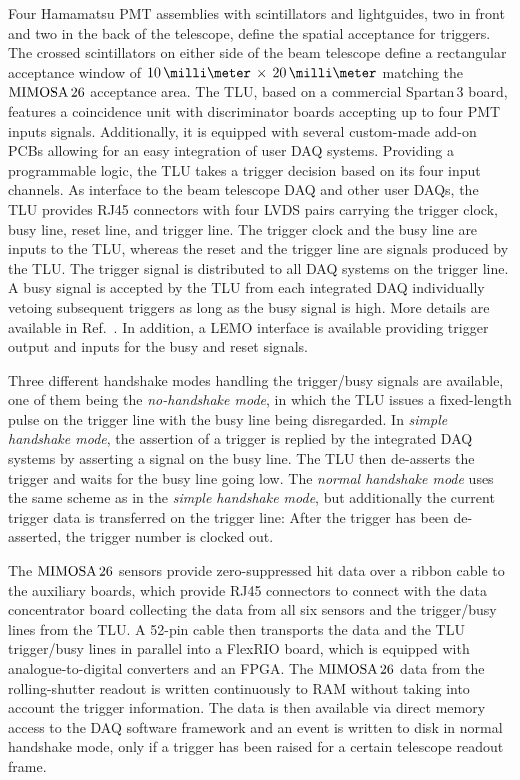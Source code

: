Four Hamamatsu PMT assemblies with scintillators and lightguides, two in front and two in the back of the telescope, define the spatial acceptance for triggers. 
The crossed scintillators on either side of the beam telescope define a rectangular acceptance window of $10\,\milli\meter\,\times\,20\,\milli\meter$ matching the $\textrm{MIMOSA\,26}$ acceptance area. 
The TLU, based on a commercial Spartan\,3 board, features a coincidence unit with discriminator boards accepting up to four PMT inputs signals. 
Additionally, it is equipped with several custom-made add-on PCBs allowing for an easy integration of user DAQ systems. 
Providing a programmable logic, the TLU  takes a trigger decision based on its four input channels. 
As interface to the beam telescope DAQ and other user DAQs, the TLU provides RJ45 connectors with four LVDS pairs carrying the trigger clock, busy line, reset line, and trigger line. 
The trigger clock and the busy line are inputs to the TLU, whereas the reset and the trigger line are signals produced by the TLU. 
The trigger signal is distributed to all DAQ systems on the trigger line. 
A busy signal is accepted by the TLU from each integrated DAQ individually vetoing subsequent triggers as long as the busy signal is high. 
More details are available in Ref.~\cite{TLU,ref:TLUproc}.
In addition, a LEMO interface is available providing trigger output and inputs for the busy and reset signals.

Three different handshake modes handling the trigger/busy signals are available, one of them being the \textit{no-handshake mode},
 in which the TLU issues a fixed-length pulse on the trigger line with the busy line being disregarded. 
In \textit{simple handshake mode}, the assertion of a trigger is replied by the integrated DAQ systems by asserting a signal on the busy line. 
The TLU then de-asserts the trigger and waits for the busy line going low.
The \textit{normal handshake mode} uses the same scheme as in the \textit{simple handshake mode}, but additionally the current trigger data is transferred on the trigger line:
After the trigger has been de-asserted, the trigger number is clocked out. 


The $\textrm{MIMOSA\,26}$ sensors provide zero-suppressed hit data over a ribbon cable to the auxiliary boards, which provide RJ45 connectors to connect with the
 data concentrator board collecting the data from all six sensors and the trigger/busy lines from the TLU. 
A 52-pin cable then transports the data and the TLU trigger/busy lines in parallel into a FlexRIO board, which is equipped with analogue-to-digital converters and an FPGA. 
The $\textrm{MIMOSA\,26}$ data from the rolling-shutter readout is written continuously to RAM without taking into account the trigger information. 
The data is then available via direct memory access to the DAQ software framework and an event is written to disk in normal handshake mode, only if a trigger has been raised for a certain telescope readout frame. 

